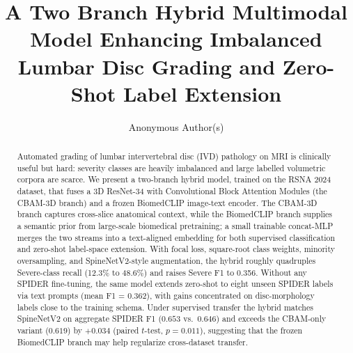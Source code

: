 \documentclass[runningheads]{llncs}
\begin{document}
%
\title{A Two Branch Hybrid Multimodal Model Enhancing Imbalanced Lumbar Disc Grading and Zero-Shot Label Extension}
%
%
%
\author{Anonymous Author(s)}
%
\maketitle
%
\begin{abstract}
Automated grading of lumbar intervertebral disc (IVD) pathology on MRI is clinically useful but hard: severity classes are heavily imbalanced and large labelled volumetric corpora are scarce. We present a two-branch hybrid model, trained on the RSNA 2024 dataset, that fuses a 3D ResNet-34 with Convolutional Block Attention Modules (the CBAM-3D branch) and a frozen BiomedCLIP image-text encoder. The CBAM-3D branch captures cross-slice anatomical context, while the BiomedCLIP branch supplies a semantic prior from large-scale biomedical pretraining; a small trainable concat-MLP merges the two streams into a text-aligned embedding for both supervised classification and zero-shot label-space extension. With focal loss, square-root class weights, minority oversampling, and SpineNetV2-style augmentation, the hybrid roughly quadruples Severe-class recall (12.3\% to 48.6\%) and raises Severe F1 to 0.356. Without any SPIDER fine-tuning, the same model extends zero-shot to eight unseen SPIDER labels via text prompts (mean F1 = 0.362), with gains concentrated on disc-morphology labels close to the training schema. Under supervised transfer the hybrid matches SpineNetV2 on aggregate SPIDER F1 ($0.653$ vs.\ $0.646$) and exceeds the CBAM-only variant ($0.619$) by $+0.034$ (paired $t$-test, $p=0.011$), suggesting that the frozen BiomedCLIP branch may help regularize cross-dataset transfer.

\end{abstract}
%
\end{document}
